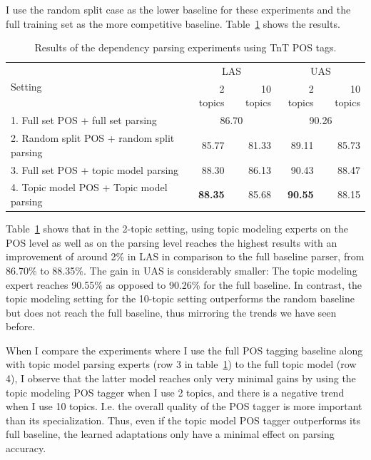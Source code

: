 I use the random split case as the lower baseline for these experiments and the full training set as the more competitive baseline. Table~\ref{tab:TnTPOS} shows the results.

\begin{table}[t!]
	\centering
	\begin{tabular}{l|rr|rr}
		\multicolumn{1}{l|}{\multirow{2}{*}{Setting}} & \multicolumn{2}{c|}{LAS} & \multicolumn{2}{c}{UAS} \\
		\multicolumn{1}{c|}{} & 2 topics & 10 topics & 2 topics & 10 topics \\ \hline
		1. Full set POS + full set parsing & \multicolumn{2}{c|}{86.70} & \multicolumn{2}{c}{90.26} \\ 
		2. Random split POS + random split parsing & 85.77 & 81.33 & 89.11 & 85.73 \\ 
		3. Full set POS + topic model parsing & 88.30 & 86.13 & 90.43 & 88.47 \\ 
		4. Topic model POS + Topic model parsing & \textbf{88.35} & 85.68 & \textbf{90.55} & 88.15 \\ 
		\hline
	\end{tabular}
	\caption{Results of the dependency parsing experiments using TnT POS tags.}
	\label{tab:TnTPOS}
\end{table}

Table~\ref{tab:TnTPOS}  shows that in the 2-topic setting, using topic modeling experts on the POS level as well as on the parsing level reaches the highest results with an improvement of around 2\% in LAS in comparison to the full baseline parser, from 86.70\% to 88.35\%. The gain in UAS is considerably smaller: The topic modeling expert reaches 90.55\% as opposed to 90.26\% for the full baseline. In contrast, the topic modeling setting for the 10-topic setting outperforms the random baseline but does not reach the full baseline,  thus mirroring the trends we have seen before.



When I compare the experiments where I use the full POS tagging baseline along with topic model parsing experts (row 3 in table~\ref{tab:TnTPOS}) to the full topic model (row 4), I observe that the latter model reaches only very minimal gains by using the topic modeling POS tagger when I use 2 topics, and there is a negative trend when I use 10 topics. I.e. the overall quality of the POS tagger is more important than its specialization. Thus, even if the topic model POS tagger outperforms its full baseline, the learned adaptations only have a minimal effect on parsing accuracy.

